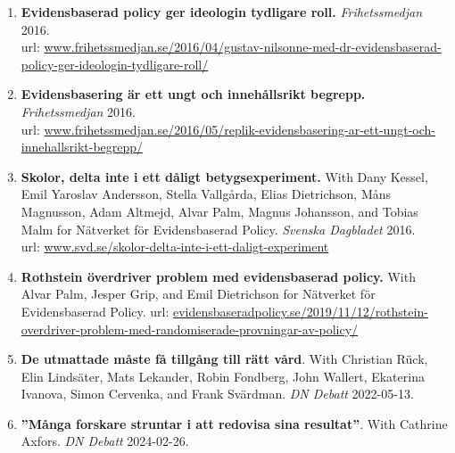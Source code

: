 \documentclass[10pt]{article}
\begin{document}
\begin{enumerate}[nolistsep]
url: \href{http://www.dagenssamhalle.se/debatt/roestraettsreform-maste-testas-pa-raett-saett-24121}{www.dagenssamhalle.se/debatt/roestraettsreform-maste-testas-pa-raett-saett-24121}
\item {\bf Evidensbaserad policy ger ideologin tydligare roll.} \emph{Frihetssmedjan} 2016.\\
url: \href{http://www.frihetssmedjan.se/2016/04/gustav-nilsonne-med-dr-evidensbaserad-policy-ger-ideologin-tydligare-roll/}{www.frihetssmedjan.se/2016/04/gustav-nilsonne-med-dr-evidensbaserad-policy-ger-ideologin-tydligare-roll/}
\item {\bf Evidensbasering är ett ungt och innehållsrikt begrepp.} \emph{Frihetssmedjan} 2016.\\
url: \href{http://www.frihetssmedjan.se/2016/05/replik-evidensbasering-ar-ett-ungt-och-innehallsrikt-begrepp/}{www.frihetssmedjan.se/2016/05/replik-evidensbasering-ar-ett-ungt-och-innehallsrikt-begrepp/}
\item {\bf Skolor, delta inte i ett dåligt betygsexperiment.} With Dany Kessel, Emil Yaroslav Andersson, Stella Vallgårda, Elias Dietrichson, Måns Magnusson, Adam Altmejd, Alvar Palm, Magnus Johansson, and Tobias Malm for Nätverket för Evidensbaserad Policy. \emph{Svenska Dagbladet} 2016.\\
url: \href{http://www.svd.se/skolor-delta-inte-i-ett-daligt-experiment}{www.svd.se/skolor-delta-inte-i-ett-daligt-experiment}
\item {\bf Rothstein överdriver problem med evidensbaserad policy.} With Alvar Palm, Jesper Grip, and Emil Dietrichson for Nätverket för Evidensbaserad Policy.
url: \href{http://evidensbaseradpolicy.se/2019/11/12/rothstein-overdriver-problem-med-randomiserade-provningar-av-policy/}{evidensbaseradpolicy.se/2019/11/12/rothstein-overdriver-problem-med-randomiserade-provningar-av-policy/}
\item {\bf De utmattade måste få tillgång till rätt vård}. With Christian Rück, Elin Lindsäter, Mats Lekander, Robin Fondberg, John Wallert, Ekaterina Ivanova, Simon Cervenka, and Frank Svärdman. \emph{DN Debatt} 2022-05-13.
\item {\bf ”Många forskare struntar i att redovisa sina resultat”}. With Cathrine Axfors. \emph{DN Debatt} 2024-02-26.
\end{enumerate}
\end{document}
